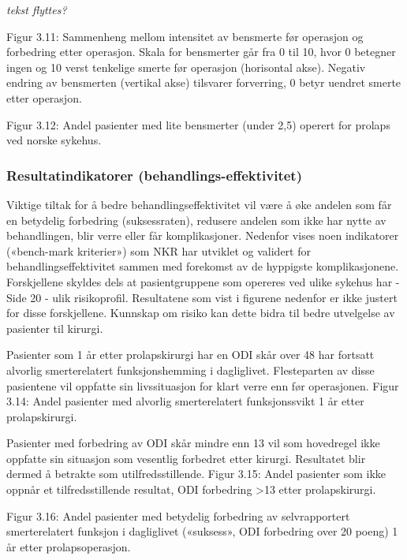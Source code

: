 \documentclass [norsk,a4paper,twoside]{article}\usepackage[]{graphicx}\usepackage[]{color}
\begin{document}
\textit{tekst flyttes?}


Figur 3.11: Sammenheng mellom intensitet av bensmerte før operasjon og
forbedring etter operasjon. Skala for bensmerter går fra 0 til 10, hvor 0 betegner
ingen og 10 verst tenkelige smerte før operasjon (horisontal akse). Negativ endring
av bensmerten (vertikal akse) tilsvarer forverring, 0 betyr uendret smerte etter
operasjon.

Figur 3.12: Andel pasienter med lite bensmerter (under 2,5) operert for prolaps ved
norske sykehus.


\subsubsection{Resultatindikatorer (behandlings-effektivitet)}
Viktige tiltak for å bedre behandlingseffektivitet vil være å øke andelen som får en
betydelig forbedring (suksessraten), redusere andelen som ikke har nytte av
behandlingen, blir verre eller får komplikasjoner. Nedenfor vises noen indikatorer
(«bench-mark kriterier») som NKR har utviklet og validert for
behandlingseffektivitet sammen med forekomst av de hyppigste komplikasjonene.
Forskjellene skyldes dels at pasientgruppene som opereres ved ulike sykehus har
- Side 20 -
ulik risikoprofil. Resultatene som vist i figurene nedenfor er ikke justert for disse
forskjellene. Kunnskap om risiko kan dette bidra til bedre utvelgelse av pasienter til
kirurgi.



Pasienter som 1 år etter prolapskirurgi har en ODI skår over 48 har fortsatt alvorlig
smerterelatert funksjonshemming i dagliglivet. Flesteparten av disse pasientene vil
oppfatte sin livssituasjon for klart verre enn før operasjonen.
Figur 3.14: Andel pasienter med alvorlig smerterelatert funksjonssvikt 1 år etter
prolapskirurgi.


Pasienter med forbedring av ODI skår mindre enn 13 vil som hovedregel ikke
oppfatte sin situasjon som vesentlig forbedret etter kirurgi. Resultatet blir dermed å
betrakte som utilfredsstillende.
Figur 3.15: Andel pasienter som ikke oppnår et tilfredsstillende resultat, ODI
forbedring >13 etter prolapskirurgi.


Figur 3.16: Andel pasienter med betydelig forbedring av selvrapportert
smerterelatert funksjon i dagliglivet («suksess», ODI forbedring over 20 poeng) 1 år
etter prolapsoperasjon.
\end{document}
